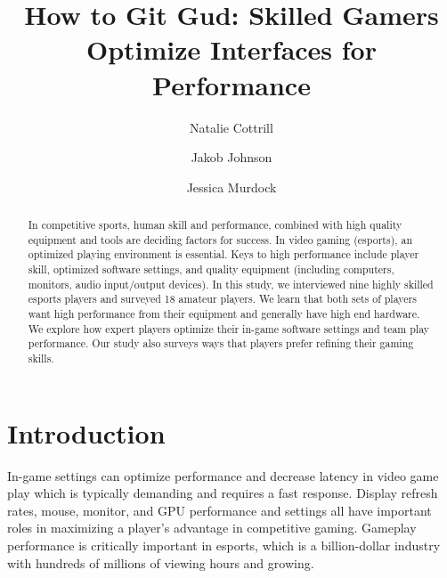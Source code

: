 \documentclass[11pt,manuscript,screen,review]{acmart} %
\begin{document}
\title{How to Git Gud: Skilled Gamers Optimize Interfaces for Performance}

\author{Natalie Cottrill}

\author{Jakob Johnson}

\author{Jessica Murdock}

\begin{abstract}
In competitive sports, human skill and performance, combined with high quality equipment and tools are deciding factors for success. In video gaming (esports), an optimized playing environment is essential. Keys to high performance include player skill, optimized software settings, and quality equipment (including computers, monitors, audio input/output devices). In this study, we interviewed nine highly skilled esports players and surveyed 18 amateur players. We learn that both sets of players want high performance from their equipment and generally have high end hardware. We explore how expert players optimize their in-game software settings and team play performance. Our study also surveys ways that players prefer refining their gaming skills.
\end{abstract}


\maketitle

\section{Introduction}
In-game settings can optimize performance and decrease latency in video game play \cite{Liu2021} which is typically demanding and requires a fast response. Display refresh rates, mouse, monitor, and GPU performance and settings all have important roles in maximizing a player's advantage in competitive gaming. Gameplay performance is critically important in esports, which is a billion-dollar industry \cite{ayles2019} with hundreds of millions of viewing hours and growing. 
\end{document}
